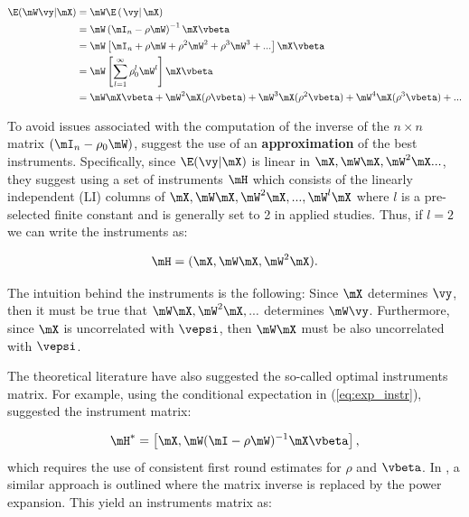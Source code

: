 \documentclass[english,12pt]{book}\usepackage[]{graphicx}\usepackage[]{xcolor}
\begin{document}
\begin{equation*}
  \begin{aligned}
\E(\mW\vy|\mX) & = \mW\E\left(\left. \vy\right| \mX\right) \\
               & = \mW\left(\mI_n - \rho \mW\right)^{-1}\mX\vbeta \\
               & = \mW\left[\mI_n + \rho\mW + \rho^2\mW^2 + \rho^3\mW^3 + ...\right]\mX\vbeta \\
               & = \mW\left[\sum_{l = 1}^{\infty}\rho_0^{l}\mW^l\right]\mX\vbeta \\
               & = \mW\mX\vbeta + \mW^2\mX(\rho\vbeta) + \mW^3\mX(\rho^2\vbeta) + \mW^4\mX(\rho^3\vbeta) + ...
  \end{aligned}
\end{equation*}

To avoid issues associated with the computation of the inverse of the $n\times n$ matrix $(\mI_n - \rho_0\mW)$, \cite{kelejian1998generalized, kelejian1999generalized} suggest the use of an \textbf{approximation} of the best instruments. Specifically, since $\E(\vy|\mX)$ is linear in $\mX, \mW\mX, \mW^2\mX...$, they suggest using a set of instruments $\mH$ which consists of the linearly independent (LI) columns of  $\mX, \mW\mX, \mW^2\mX, ... , \mW^l\mX$  where $l$ is a pre-selected finite constant and is generally set to 2 in applied studies. Thus, if $l =2$ we can write the instruments as:

\begin{equation*}
  \mH = (\mX, \mW\mX, \mW^2\mX).
\end{equation*}

\begin{remark}
The intuition behind the instruments is the following: Since $\mX$ determines $\vy$, then it must be true that $\mW\mX, \mW^2\mX, ...$ determines $\mW\vy$. Furthermore, since $\mX$ is uncorrelated with $\vepsi$, then $\mW\mX$ must be also uncorrelated with $\vepsi$.
\end{remark}

The theoretical literature have also suggested the so-called optimal instruments matrix. For example, using the conditional expectation in (\ref{eq:exp_instr}), \cite{lee2003best} suggested the instrument matrix:

\begin{equation*}
\mH^* =\left[\mX, \mW(\mI - \rho\mW)^{-1}\mX\vbeta\right],
\end{equation*}
%
which requires the use of consistent first round estimates for $\rho$ and $\vbeta$.  In \cite{Keliejian2004}, a similar approach is outlined where the matrix inverse is replaced by the power expansion. This yield an instruments matrix as:
\end{document}
